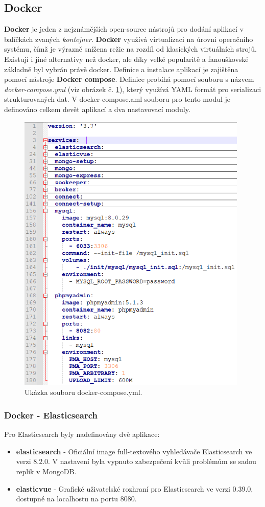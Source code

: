 \subsection{Docker}
\textbf{Docker} je jeden z nejznámějších open-source nástrojů pro dodání aplikací v balíčkách zvaných \textit{kontejner}. \textbf{Docker} využívá virtualizaci na úrovni operačního systému, čímž je výrazně snížena režie na rozdíl od klasických virtuálních strojů. Existují i jiné alternativy než docker, ale díky velké popularitě a fanouškovské základně byl vybrán právě docker.
\newline
\indent Definice a instalace aplikací je zajištěna pomocí nástroje \textbf{Docker compose}. Definice probíhá pomocí souboru s názvem \textit{docker-compose.yml} (viz obrázek č. \ref{fig:compose}), který využívá \gls{YAML} formát pro serializaci strukturovaných dat. V docker-compose.aml souboru pro tento modul je definováno celkem devět aplikací a dva nastavovací moduly.
\begin{figure}[H]
\centering
\includegraphics[width=11cm]{img/compose}
\caption{Ukázka souboru docker-compose.yml.}
\label{fig:compose}
\end{figure}

\subsubsection{Docker - Elasticsearch}
Pro Elasticsearch byly nadefinovány dvě aplikace:
\begin{itemize}
\item \textbf{elasticsearch} - Oficiální image full-textového vyhledávače Elasticsearch ve verzi 8.2.0. V nastavení byla vypnuto zabezpečení kvůli problémům se sadou replik v MongoDB.
\item \textbf{elasticvue} - Grafické uživatelské rozhraní pro Elasticsearch ve verzi 0.39.0, dostupné na localhostu na portu 8080.
\end{itemize}

